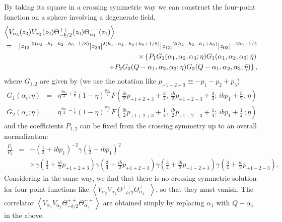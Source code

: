 \documentclass[a4paper,12pt]{article}
\newcommand{\vev}[1]{\left<{#1}\right>}
\newcommand{\tfrac}[2]{{\textstyle\frac{#1}{#2}}}
\begin{document}
   By taking its square in a crossing symmetric way we can construct
 the four-point function on a sphere involving a degenerate field,
\begin{eqnarray}
\lefteqn{
  \vev{V_{\alpha_3}(z_3)V_{\alpha_2}(z_2)
       \Theta_{-b/2}^{++}(z_0)\Theta_{\alpha_1}^{--}(z_1)} } \nonumber \\
 &=& |z_{12}|^{2(h_3-h_1-h_2-h_0-1/8)}
   |z_{23}|^{2(h_1-h_2-h_3+h_0+1/8)}
   |z_{13}|^{2(h_2-h_3-h_1+h_0)}
   |z_{03}|^{-4h_0-1/4}
 \nonumber \\ && \times
   \left\{P_1G_1(\alpha_1,\alpha_2,\alpha_3;\eta)
             G_1(\alpha_1,\alpha_2,\alpha_3;\bar{\eta})
  \right. \nonumber \\ && ~~~\left.
         +P_2G_2(Q-\alpha_1,\alpha_2,\alpha_3;\eta)
             G_2(Q-\alpha_1,\alpha_2,\alpha_3;\bar{\eta})
   \right\},
\label{VVSS}
\end{eqnarray}
 where $G_{1,2}$ are given by
 (we use the notation like $p_{-1-2+3}\equiv -p_1-p_2+p_3$)
\begin{equation}
\begin{array}{rcl}
 G_1(\alpha_i;\eta) &=&
 \eta^{\frac{b\alpha_1}{2}+\frac{3}{8}}
 (1-\eta)^{\frac{b\alpha_2}{2}}
 F(\frac{ib}{2}p_{+1+2+3}+\frac{3}{4},\,
   \frac{ib}{2}p_{+1+2-3}+\frac{3}{4};\,
   ibp_1+\frac{3}{2};\,\eta) \\
 G_2(\alpha_i;\eta) &=&
 \eta^{\frac{b\alpha_1}{2}-\frac{1}{8}}
 (1-\eta)^{\frac{b\alpha_2}{2}}
 F(\frac{ib}{2}p_{+1+2+3}+\frac{1}{4},\,
   \frac{ib}{2}p_{+1+2-3}+\frac{1}{4};\,
   ibp_1+\frac{1}{2}\,;\eta)
\end{array}
\end{equation}
 and the coefficients $P_{1,2}$ can be fixed from the crossing symmetry
 up to an overall normalization:
\begin{eqnarray}
 \frac{P_1}{P_2}&=&
 -(\tfrac{1}{2}+ibp_1)^{-2}
  \gamma(\tfrac{1}{2}-ibp_1)^2
 \nonumber \\ && \times
  \gamma(\tfrac{3}{4}+\tfrac{ib}{2}p_{+1+2+3})
  \gamma(\tfrac{3}{4}+\tfrac{ib}{2}p_{+1+2-3})
  \gamma(\tfrac{3}{4}+\tfrac{ib}{2}p_{+1-2+3})
  \gamma(\tfrac{3}{4}+\tfrac{ib}{2}p_{+1-2-3}).
\end{eqnarray}
 Considering in the same way, we find that there is no
 crossing symmetric solution for four point functions like
 $\vev{V_{\alpha_3}V_{\alpha_2}\Theta_{-b/2}^{++}\Theta_{\alpha_1}^{+-}}$,
 so that they must vanish.
 The correlator
 $\vev{V_{\alpha_3}V_{\alpha_2}\Theta_{-b/2}^{++}\Theta_{\alpha_1}^{++}}$
 are obtained simply by replacing $\alpha_1$ with $Q-\alpha_1$
 in the above.
\end{document}
